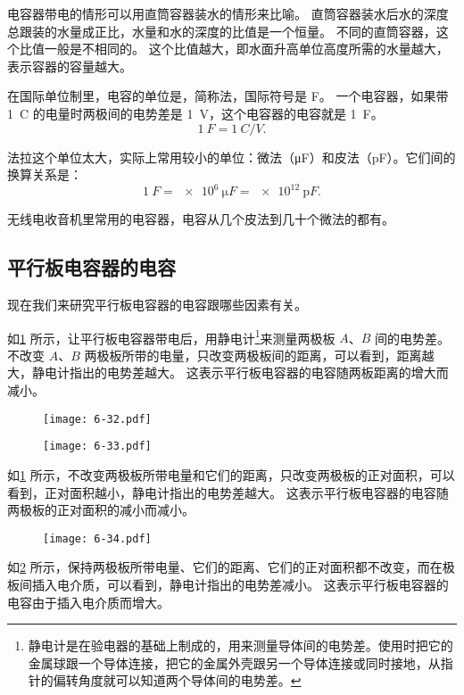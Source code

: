 电容器带电的情形可以用直筒容器装水的情形来比喻。
直筒容器装水后水的深度总跟装的水量成正比，水量和水的深度的比值是一个恒量。
不同的直筒容器，这个比值一般是不相同的。
这个比值越大，即水面升高单位高度所需的水量越大，表示容器的容量越大。

在国际单位制里，电容的单位是，简称法，国际符号是 \unit{F}。
一个电容器，如果带 \qty{1}{C} 的电量时两极间的电势差是 \qty{1}{V}，这个电容器的电容就是 \qty{1}{F}。
\[\qty{1}{F}=\qty{1}{C/V}.\]

法拉这个单位太大，实际上常用较小的单位：微法（\unit{\micro F}）和皮法（\unit{\pico F}）。它们间的换算关系是：
\[\qty{1}{F}=\qty{e6}{\micro F}=\qty{e12}{\pico F}.\]

无线电收音机里常用的电容器，电容从几个皮法到几十个微法的都有。

\subsection{平行板电容器的电容}
现在我们来研究平行板电容器的电容跟哪些因素有关。

如\cref{fig:6-33} 所示，让平行板电容器带电后，用静电计\footnote{静电计是在验电器的基础上制成的，用来测量导体间的电势差。使用时把它的金属球跟一个导体连接，把它的金属外壳跟另一个导体连接或同时接地，从指针的偏转角度就可以知道两个导体间的电势差。}来测量两极板 $A$、$B$ 间的电势差。
不改变 $A$、$B$ 两极板所带的电量，只改变两极板间的距离，可以看到，距离越大，静电计指出的电势差越大。
这表示平行板电容器的电容随两板距离的增大而减小。

\begin{figure}
	\begin{minipage}[b]{0.48\linewidth}\centering
		\texttt{[image: 6-32.pdf]}
		\caption{}\label{fig:6-32}
	\end{minipage}
	\begin{minipage}[b]{0.48\linewidth}\centering
		\texttt{[image: 6-33.pdf]}
		\caption{}\label{fig:6-33}
	\end{minipage}
\end{figure}

如\cref{fig:6-33} 所示，不改变两极板所带电量和它们的距离，只改变两极板的正对面积，可以看到，正对面积越小，静电计指出的电势差越大。
这表示平行板电容器的电容随两极板的正对面积的减小而减小。
\begin{figure}
	\texttt{[image: 6-34.pdf]}
	\caption{}\label{fig:6-34}
\end{figure}

如\cref{fig:6-34} 所示，保持两极板所带电量、它们的距离、它们的正对面积都不改变，而在极板间插入电介质，可以看到，静电计指出的电势差减小。
这表示平行板电容器的电容由于插入电介质而增大。

